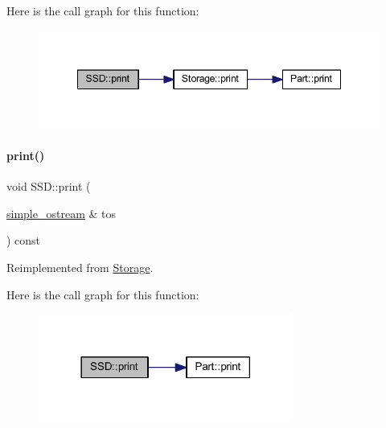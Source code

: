 Here is the call graph for this function\+:
\nopagebreak
\begin{figure}[H]
\begin{center}
\leavevmode
\includegraphics[width=348pt]{class_s_s_d_ab07086e302f8be99cfa757583d2017a0_cgraph}
\end{center}
\end{figure}
\mbox{\label{class_s_s_d_a7efed56d8590399c61d8eefca9295c91}} 
\paragraph{\texorpdfstring{print()}{print()}\hspace{0.1cm}{\footnotesize\ttfamily [3/4]}}
{\footnotesize\ttfamily void S\+S\+D\+::print (\begin{DoxyParamCaption}\item[{\mbox{\hyperlink{structsimple__ostream}{simple\+\_\+ostream}} \&}]{tos }\end{DoxyParamCaption}) const\hspace{0.3cm}{\ttfamily [virtual]}}



Reimplemented from \mbox{\hyperlink{class_storage_a53fc5b4814df41517b9f2be8dcef605e}{Storage}}.

Here is the call graph for this function\+:
\nopagebreak
\begin{figure}[H]
\begin{center}
\leavevmode
\includegraphics[width=237pt]{class_s_s_d_a7efed56d8590399c61d8eefca9295c91_cgraph}
\end{center}
\end{figure}
\mbox{\label{class_s_s_d_a6e252152f8ba75043edec67e19d686e0}} 
